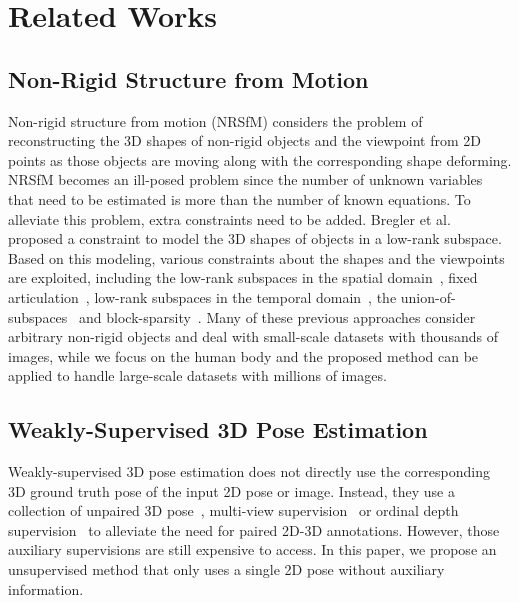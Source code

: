 \documentclass[letterpaper]{article} \usepackage{aaai21}  \usepackage{times}  \usepackage{helvet} \usepackage{courier}  \usepackage[hyphens]{url}  \usepackage{graphicx} \urlstyle{rm} \def\UrlFont{\rm}  \usepackage{natbib}  \usepackage{caption} \frenchspacing  \setlength{\pdfpagewidth}{8.5in}  \setlength{\pdfpageheight}{11in}
\begin{document}
\section{Related Works}
\subsection{Non-Rigid Structure from Motion} Non-rigid structure from motion (NRSfM) considers the problem of reconstructing the 3D shapes of non-rigid objects and the viewpoint from 2D points as those objects are moving along with the corresponding shape deforming. NRSfM becomes an ill-posed problem since the number of unknown variables that need to be estimated is more than the number of known equations. To alleviate this problem, extra constraints need to be added. Bregler et al.~\cite{bregler2000recovering} proposed a constraint to model the 3D shapes of objects in a low-rank subspace. Based on this modeling, various constraints about the shapes and the viewpoints are exploited, including the low-rank subspaces in the spatial domain~\cite{dai2014simple,fragkiadaki2014grouping}, fixed articulation~\cite{ramakrishna2012reconstructing}, low-rank subspaces in the temporal domain~\cite{akhter2009nonrigid,akhter2010trajectory}, the union-of-subspaces~\cite{zhu2014complex,agudo2018image} and block-sparsity~\cite{kong2016prior}. Many of these previous approaches consider arbitrary non-rigid objects and deal with small-scale datasets with thousands of images, while we focus on the human body and the proposed method can be applied to handle large-scale datasets with millions of images.

\subsection{Weakly-Supervised 3D Pose Estimation}
Weakly-supervised 3D pose estimation does not directly use the corresponding 3D ground truth pose of the input 2D pose or image. Instead, they use a collection of unpaired 3D pose~\cite{tung2017adversarial,wandt2019repnet,zhou2016sparseness}, multi-view supervision~\cite{kocabas2019self,rhodin2018learning,li2020geometry} or ordinal depth supervision~\cite{pavlakos2018ordinal} to alleviate the need for paired 2D-3D annotations. However, those auxiliary supervisions are still expensive to access. In this paper, we propose an unsupervised method that only uses a single 2D pose without auxiliary information.
\end{document}
